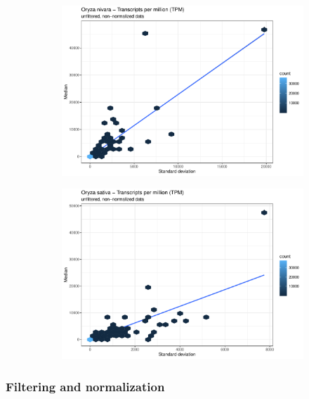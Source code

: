 \begin{figure}[htbp]
    \caption{TPM statistics about the imported kallisto data}
    \label{fig:2.1-TPM-Stats}
    \begin{subfigure}[t]{0.48\linewidth}
        \label{fig:2.1-TPM-Stats-Oryza_nivara}
        \includegraphics[width=\textwidth]{../../results/plots-and-tables/2.1-TPM-Stats-Oryza_nivara}
    \end{subfigure}
    \begin{subfigure}[t]{0.48\linewidth}
        \label{fig:2.1-TPM-Stats-Oryza_sativa}
        \includegraphics[width=\textwidth]{../../results/plots-and-tables/2.1-TPM-Stats-Oryza_sativa}
    \end{subfigure}
\end{figure}

\subsubsection{Filtering and normalization}

